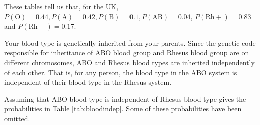 \documentclass[
  british,
  11pt,
  openany, a4paper]{book}
\begin{document}
These tables tell us that, for the UK, \(P(\text{O})=0.44, P(\text{A})=0.42, P(\text{B})=0.1, P(\text{AB})=0.04\), \(P(\text{Rh}+)=0.83\) and \(P(\text{Rh}-)=0.17\).

Your blood type is genetically inherited from your parents. Since the genetic code responsible for inheritance of ABO blood group and Rhesus blood group are on different chromosomes, ABO and Rhesus blood types are inherited independently of each other. That is, for any person, the blood type in the ABO system is independent of their blood type in the Rhesus system.

Assuming that ABO blood type is independent of Rhesus blood type gives the probabilities in Table \ref{tab:bloodindep}. Some of these probabilities have been omitted.

 
  \providecommand{\huxb}[2]{\arrayrulecolor[RGB]{#1}\global\arrayrulewidth=#2pt}
  \providecommand{\huxvb}[2]{\color[RGB]{#1}\vrule width #2pt}
  \providecommand{\huxtpad}[1]{\rule{0pt}{#1}}
  \providecommand{\huxbpad}[1]{\rule[-#1]{0pt}{#1}}
\end{document}
